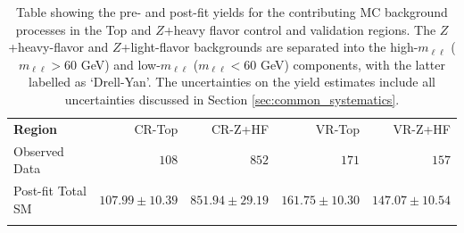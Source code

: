 \begin{table}
\begin{center}
\caption{
Table showing the pre- and post-fit yields for the contributing MC background processes in the
Top and $Z$+heavy flavor control and validation regions.
The $Z$+heavy-flavor and $Z$+light-flavor backgrounds are separated into the high-$m_{\ell \ell}$
($m_{\ell \ell} > 60$ GeV) and low-$m_{\ell \ell}$ ($m_{\ell \ell} < 60$ GeV) components,
with the latter labelled as `Drell-Yan'.
The uncertainties on the yield estimates include all uncertainties discussed in Section \ref{sec:common_systematics}.
}
\label{tab:hh_crvr_yields}
\setlength{\tabcolsep}{0.0pc}
{\small
\begin{tabular*}{\textwidth}{@{\extracolsep{\fill}}lrrrr}
\noalign{\smallskip}\hline\noalign{\smallskip}
\textbf{Region}          & CR-Top            & CR-Z+HF            & VR-Top            & VR-Z+HF              \\[-0.05cm]
\noalign{\smallskip}\hline\noalign{\smallskip}
 Observed Data         & $108$              & $852$              & $171$              & $157$                    \\
\noalign{\smallskip}\hline\noalign{\smallskip}
 Post-fit Total SM          & $107.99 \pm 10.39$          & $851.94 \pm 29.19$          & $161.75 \pm 10.30$          & $147.07 \pm 10.54$              \\
\noalign{\smallskip}\hline\noalign{\smallskip}


\end{tabular*}}
\end{center}
\end{table}
